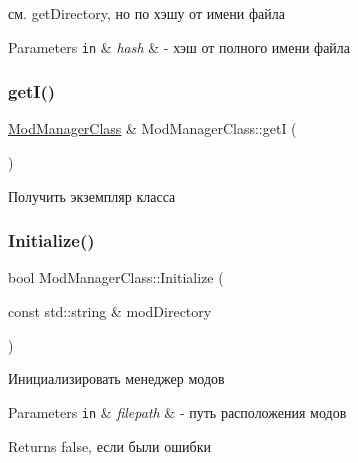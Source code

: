 см. get\+Directory, но по хэшу от имени файла 


\begin{DoxyParams}[1]{Parameters}
\mbox{\tt in}  & {\em hash} & -\/ хэш от полного имени файла \\
\hline
\end{DoxyParams}
\mbox{\label{class_mod_manager_class_adeaeac4e6df4e887b5d6871347348267}} 
\subsubsection{\texorpdfstring{get\+I()}{getI()}}
{\footnotesize\ttfamily \hyperlink{class_mod_manager_class}{Mod\+Manager\+Class} \& Mod\+Manager\+Class\+::getI (\begin{DoxyParamCaption}{ }\end{DoxyParamCaption})\hspace{0.3cm}{\ttfamily [static]}}



Получить экземпляр класса 

\mbox{\label{class_mod_manager_class_a46a072f485ab9383d3cfa7a718cc5797}} 
\subsubsection{\texorpdfstring{Initialize()}{Initialize()}}
{\footnotesize\ttfamily bool Mod\+Manager\+Class\+::\+Initialize (\begin{DoxyParamCaption}\item[{const std\+::string \&}]{mod\+Directory }\end{DoxyParamCaption})}



Инициализировать менеджер модов 


\begin{DoxyParams}[1]{Parameters}
\mbox{\tt in}  & {\em filepath} & -\/ путь расположения модов \\
\hline
\end{DoxyParams}
\begin{DoxyReturn}{Returns}
false, если были ошибки 
\end{DoxyReturn}
\mbox{\label{class_mod_manager_class_a70d35681d5471c6157c079cb45689688}} 
